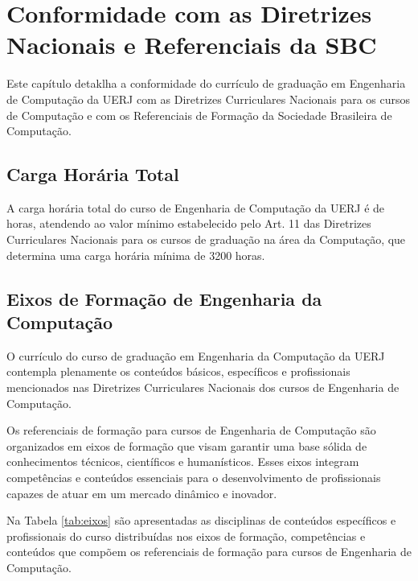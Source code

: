 \chapter{Conformidade com as Diretrizes Nacionais e Referenciais da SBC}

Este capítulo detaklha a conformidade do currículo de graduação em Engenharia de Computação da UERJ com as Diretrizes Curriculares Nacionais para os cursos de Computação e com os  Referenciais de Formação da Sociedade Brasileira de Computação.


\section{Carga Horária Total}

A carga horária total do curso de Engenharia de Computação da UERJ é de \tHorasCurso horas, atendendo ao valor mínimo estabelecido pelo Art. 11 das Diretrizes Curriculares Nacionais para os cursos de graduação na área da Computação, que determina uma carga horária mínima de 3200 horas.


\section{Eixos de Formação de Engenharia da Computação}

O currículo do curso de graduação em Engenharia da Computação da UERJ contempla plenamente os conteúdos básicos, específicos e profissionais mencionados nas Diretrizes Curriculares Nacionais dos cursos de Engenharia de Computação.

Os referenciais de formação para cursos de Engenharia de Computação são organizados em eixos de formação que visam garantir uma base sólida de conhecimentos técnicos, científicos e humanísticos. Esses eixos integram competências e conteúdos essenciais para o desenvolvimento de profissionais capazes de atuar em um mercado dinâmico e inovador.

Na Tabela \ref{tab:eixos} são apresentadas as disciplinas de conteúdos específicos e profissionais do curso distribuídas nos eixos de formação, competências e conteúdos que compõem os referenciais de formação para cursos de Engenharia de Computação.



